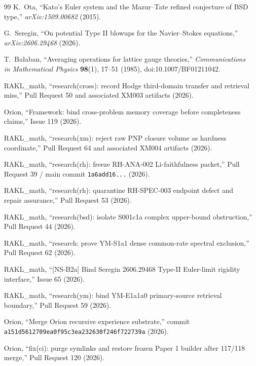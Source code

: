 \begin{thebibliography}{99}
K.~Ota,
``Kato's Euler system and the Mazur--Tate refined conjecture of BSD type,''
\emph{arXiv:1509.00682} (2015).

G.~Seregin,
``On potential Type II blowups for the Navier--Stokes equations,''
\emph{arXiv:2606.29468} (2026).

T.~Ba\l aban,
``Averaging operations for lattice gauge theories,''
\emph{Communications in Mathematical Physics} \textbf{98}(1), 17--51 (1985),
doi:10.1007/BF01211042.

RAKL\_math,
``research(cross): record Hodge third-domain transfer and retrieval miss,''
Pull Request 50 and associated XM003 artifacts (2026).

Orion,
``Framework: bind cross-problem memory coverage before completeness claims,''
Issue 119 (2026).

RAKL\_math,
``research(xm): reject raw PNP closure volume as hardness coordinate,''
Pull Request 64 and associated XM004 artifacts (2026).

RAKL\_math,
``research(rh): freeze RH-ANA-002 Li-faithfulness packet,''
Pull Request 39 / main commit \texttt{1a6add16...} (2026).

RAKL\_math,
``research(rh): quarantine RH-SPEC-003 endpoint defect and repair assurance,''
Pull Request 53 (2026).

RAKL\_math,
``research(bsd): isolate S001c1a complex upper-bound obstruction,''
Pull Request 44 (2026).

RAKL\_math,
``research: prove YM-S1a1 dense common-rate spectral exclusion,''
Pull Request 62 (2026).

RAKL\_math,
``[NS-B2a] Bind Seregin 2606.29468 Type-II Euler-limit rigidity interface,''
Issue 65 (2026).

RAKL\_math,
``research(ym): bind YM-E1a1a0 primary-source retrieval boundary,''
Pull Request 59 (2026).

Orion,
``Merge Orion recursive experience substrate,''
commit \texttt{a151d5612709ea0f95c3ea232630f246f722739a} (2026).

Orion,
``fix(ci): purge symlinks and restore frozen Paper 1 builder after 117/118 merge,''
Pull Request 120 (2026).



\end{thebibliography}
